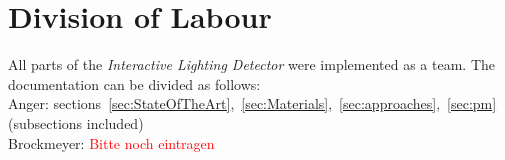 \section{Division of Labour } \label{sec:Division}
All parts of the \textit{Interactive Lighting Detector} were implemented as a team. The documentation can be divided as follows: \\

Anger: sections~\ref{sec:StateOfTheArt},~\ref{sec:Materials},~\ref{sec:approaches},~\ref{sec:pm}  (subsections included) \\
Brockmeyer: \textcolor{red}{Bitte noch eintragen}

\newpage

























